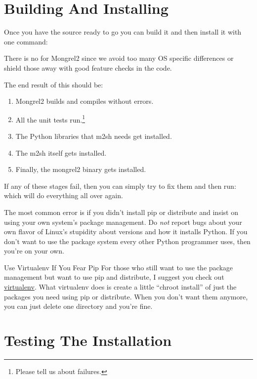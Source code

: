 \section{Building And Installing}

Once you have the source ready to go you can build it and then install it with
one command:  

There is no  for Mongrel2 since we avoid too many OS specific
differences or shield those away with good feature checks in the code.

The end result of this should be:

\begin{enumerate}
\item Mongrel2 builds and compiles without errors.
\item All the unit tests run.\footnote{Please tell us about failures.}
\item The Python libraries that m2sh needs get installed.
\item The m2sh itself gets installed.
\item Finally, the mongrel2 binary gets installed.
\end{enumerate}

If any of these stages fail, then you can simply try to fix them and then
run:   which will do everything all over again.

The most common error is if you didn't install pip or distribute and insist
on using your own system's package management.  Do \emph{not} report bugs about
your own flavor of Linux's stupidity about versions and how it installs Python.
If you don't want to use the package system every other Python programmer uses,
then you're on your own.

\begin{aside}{Use Virtualenv If You Fear Pip}
For those who still want to use the package management but want to use pip and
distribute, I suggest you check out \href{http://pypi.python.org/pypi/virtualenv}{virtualenv}.
What virtualenv does is create a little ``chroot install'' of just the packages
you need using pip or distribute.  When you don't want them anymore, you can just
delete one directory and you're fine.
\end{aside}


\section{Testing The Installation}


